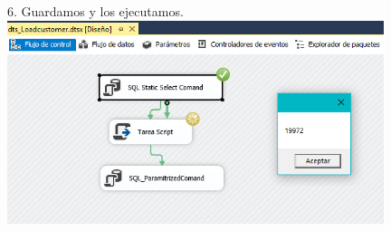 \begin{itemize}
\begin{center}
\item 6. Guardamos y los ejecutamos.\\
	\includegraphics[width=11cm]{./Imagenes/img27}
	\end{center}	
\end{itemize}